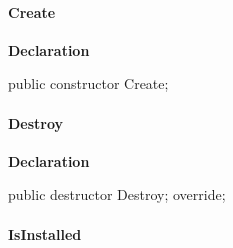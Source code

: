 \documentclass{report}
\newif\ifpdf
\begin{document}
\paragraph*{Create}\hspace*{\fill}

\label{packagekit.TPackageKit-Create}
\begin{list}{}{
\setlength{\itemindent}{0cm}
\setlength{\listparindent}{0cm}
\setlength{\leftmargin}{\evensidemargin}
\addtolength{\leftmargin}{\tmplength}
\settowidth{\labelsep}{X}
\addtolength{\leftmargin}{\labelsep}
\setlength{\labelwidth}{\tmplength}
}
\item[\textbf{Declaration}\hfill]
\ifpdf
\begin{flushleft}
\fi
\begin{ttfamily}
public constructor Create;\end{ttfamily}

\ifpdf
\end{flushleft}
\fi

\end{list}
\paragraph*{Destroy}\hspace*{\fill}

\label{packagekit.TPackageKit-Destroy}
\begin{list}{}{
\setlength{\itemindent}{0cm}
\setlength{\listparindent}{0cm}
\setlength{\leftmargin}{\evensidemargin}
\addtolength{\leftmargin}{\tmplength}
\settowidth{\labelsep}{X}
\addtolength{\leftmargin}{\labelsep}
\setlength{\labelwidth}{\tmplength}
}
\item[\textbf{Declaration}\hfill]
\ifpdf
\begin{flushleft}
\fi
\begin{ttfamily}
public destructor Destroy; override;\end{ttfamily}

\ifpdf
\end{flushleft}
\fi

\end{list}
\paragraph*{IsInstalled}\hspace*{\fill}
\end{document}
